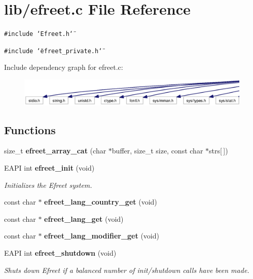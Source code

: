 \section{lib/efreet.c File Reference}
\label{efreet_8c}


{\tt \#include \char`\"{}Efreet.h\char`\"{}}\par
{\tt \#include \char`\"{}efreet\_\-private.h\char`\"{}}\par


Include dependency graph for efreet.c:\nopagebreak
\begin{figure}[H]
\begin{center}
\leavevmode
\includegraphics[width=420pt]{efreet_8c__incl}
\end{center}
\end{figure}
\subsection*{Functions}
\begin{CompactItemize}
\item 
size\_\-t {\bf efreet\_\-array\_\-cat} (char $\ast$buffer, size\_\-t size, const char $\ast$strs[$\,$])
\item 
EAPI int {\bf efreet\_\-init} (void)
\begin{CompactList}\small\item\em Initializes the Efreet system. \item\end{CompactList}\item 
const char $\ast$ {\bf efreet\_\-lang\_\-country\_\-get} (void)
\item 
const char $\ast$ {\bf efreet\_\-lang\_\-get} (void)
\item 
const char $\ast$ {\bf efreet\_\-lang\_\-modifier\_\-get} (void)
\item 
EAPI int {\bf efreet\_\-shutdown} (void)
\begin{CompactList}\small\item\em Shuts down Efreet if a balanced number of init/shutdown calls have been made. \item\end{CompactList}\end{CompactItemize}


